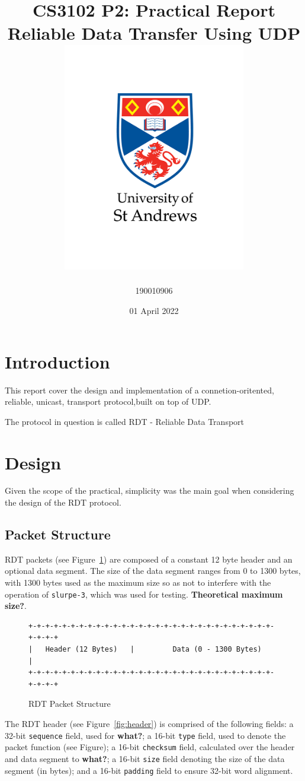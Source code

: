 \documentclass[12pt]{article}
\title{
{CS3102 P2: Practical Report}\\
{\large Reliable Data Transfer Using UDP}\\
{\includegraphics[width=80mm]{university-logo.png}}
}
\author{190010906}
\date{01 April 2022}
\def\code#1{\texttt{#1}}
\begin{document}
\maketitle

\newpage

\section{Introduction}

This report cover the design and implementation of a connetion-oritented, reliable, unicast, transport protocol,built on top of UDP.

The protocol in question is called RDT - Reliable Data Transport

\section{Design}

Given the scope of the practical, simplicity was the main goal when considering the design of the RDT protocol.


\subsection{Packet Structure}

RDT packets (see Figure~\ref{fig:packet}) are composed of a constant 12 byte header and an optional data segment. The size of the data segment ranges from 0 to 1300 bytes, with 1300 bytes used as the maximum size so as not to interfere with the operation of \code{slurpe-3}, which was used for testing. \textbf{Theoretical maximum size?}.

\begin{figure}[h]
\begin{verbatim}
+-+-+-+-+-+-+-+-+-+-+-+-+-+-+-+-+-+-+-+-+-+-+-+-+-+-+-+-+-+-+-+-+
|   Header (12 Bytes)   |         Data (0 - 1300 Bytes)         |
+-+-+-+-+-+-+-+-+-+-+-+-+-+-+-+-+-+-+-+-+-+-+-+-+-+-+-+-+-+-+-+-+
\end{verbatim}
\caption{RDT Packet Structure}\label{fig:packet}
\end{figure}

The RDT header (see Figure~\ref{fig:header}) is comprised of the following fields: a 32-bit \code{sequence} field, used for \textbf{what?}; a 16-bit \code{type} field, used to denote the packet function (see Figure); a 16-bit \code{checksum} field, calculated over the header and data segment to \textbf{what?}; a 16-bit \code{size} field denoting the size of the data segment (in bytes); and a 16-bit \code{padding} field to ensure 32-bit word alignment.
\end{document}
